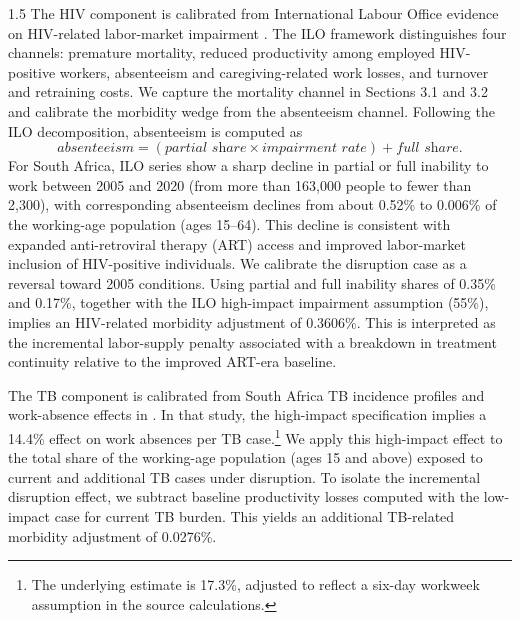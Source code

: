 \documentclass[letterpaper,12pt]{article}
\theoremstyle{definition}
\begin{document}
\begin{spacing}{1.5}
The HIV component is calibrated from International Labour Office evidence on HIV-related labor-market impairment \citep{ILO2018}. The ILO framework distinguishes four channels: premature mortality, reduced productivity among employed HIV-positive workers, absenteeism and caregiving-related work losses, and turnover and retraining costs. We capture the mortality channel in Sections 3.1 and 3.2 and calibrate the morbidity wedge from the absenteeism channel. Following the ILO decomposition, absenteeism is computed as
\[
\textit{absenteeism} = (\textit{partial share} \times \textit{impairment rate}) + \textit{full share}.
\]
For South Africa, ILO series show a sharp decline in partial or full inability to work between 2005 and 2020 (from more than 163,000 people to fewer than 2,300), with corresponding absenteeism declines from about 0.52\% to 0.006\% of the working-age population (ages 15--64). This decline is consistent with expanded anti-retroviral therapy (ART) access and improved labor-market inclusion of HIV-positive individuals. We calibrate the disruption case as a reversal toward 2005 conditions. Using partial and full inability shares of 0.35\% and 0.17\%, together with the ILO high-impact impairment assumption (55\%), implies an HIV-related morbidity adjustment of 0.3606\%. This is interpreted as the incremental labor-supply penalty associated with a breakdown in treatment continuity relative to the improved ART-era baseline.

The TB component is calibrated from South Africa TB incidence profiles and work-absence effects in \citet{Keogh2024}. In that study, the high-impact specification implies a 14.4\% effect on work absences per TB case.\footnote{The underlying estimate is 17.3\%, adjusted to reflect a six-day workweek assumption in the source calculations.} We apply this high-impact effect to the total share of the working-age population (ages 15 and above) exposed to current and additional TB cases under disruption. To isolate the incremental disruption effect, we subtract baseline productivity losses computed with the low-impact case for current TB burden. This yields an additional TB-related morbidity adjustment of 0.0276\%.


\end{spacing}
\end{document}

